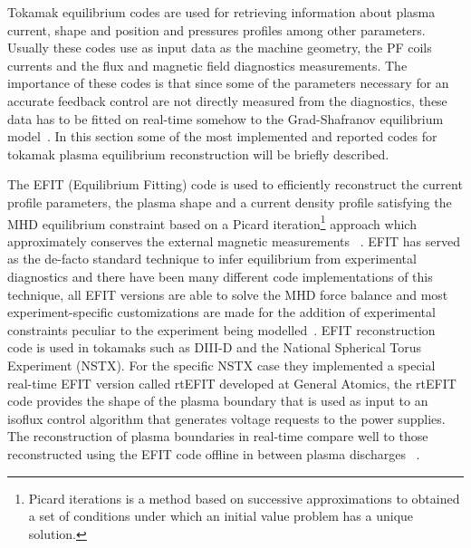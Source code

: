 Tokamak equilibrium codes are used for retrieving information about plasma current, shape and position and pressures profiles among other parameters. Usually these codes use as input data as the machine geometry, the PF coils currents and the flux and magnetic field diagnostics measurements. The importance of these codes is that since some of the parameters necessary for an accurate feedback control are not directly measured from the diagnostics,  these data has to be fitted on real-time somehow to the Grad-Shafranov equilibrium model~\cite{Shafranov1971}. In this section some of the most implemented and reported codes for tokamak plasma equilibrium reconstruction will be briefly  described.
\smallskip 


The EFIT (Equilibrium Fitting) code is used to efficiently reconstruct the current profile parameters, the plasma shape  and a current density profile satisfying the MHD equilibrium constraint  based on a Picard iteration\footnote{Picard iterations is a method based on  successive approximations to obtained a set of conditions under which an initial value problem has a unique solution.} approach which approximately conserves the external magnetic measurements ~\cite{EFIT1985}. EFIT has served as the de-facto standard technique to infer equilibrium from experimental diagnostics and there have been many different code implementations of this technique, all EFIT versions  are able to solve the MHD force balance and most experiment-specific customizations are made for the addition of experimental constraints peculiar to the experiment being modelled~\cite{EFIT2013}. EFIT reconstruction code is used in tokamaks such as DIII-D and the National Spherical Torus Experiment (NSTX). For the specific NSTX case they implemented a special real-time EFIT version called rtEFIT developed at General Atomics, the rtEFIT code provides the shape of the plasma boundary that is used as input to an isoflux control algorithm that generates voltage requests to the power supplies. The reconstruction of plasma boundaries  in real-time compare well to those reconstructed using the EFIT code offline in between plasma discharges ~\cite{rtEFIT}.
\smallskip


